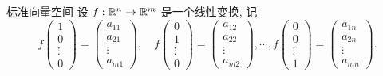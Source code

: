 \begin{frame}{标准向量空间\noexer}
	\onslide<+->
	设 $f:{\mathbb{R}}^n\to{\mathbb{R}}^m$ 是一个线性变换,
	\onslide<+->
	记
	\[f\begin{pmatrix}
		1\\0\\\vdots\\0
	\end{pmatrix}=\begin{pmatrix}
		a_{11}\\a_{21}\\\vdots\\a_{m1}
	\end{pmatrix},\quad
	f\begin{pmatrix}
		0\\1\\\vdots\\0
	\end{pmatrix}=\begin{pmatrix}
		a_{12}\\a_{22}\\\vdots\\a_{m2}
	\end{pmatrix},\cdots,
	f\begin{pmatrix}
		0\\0\\\vdots\\1
	\end{pmatrix}=\begin{pmatrix}
		a_{1n}\\a_{2n}\\\vdots\\a_{mn}
	\end{pmatrix}.\]
\end{frame}


